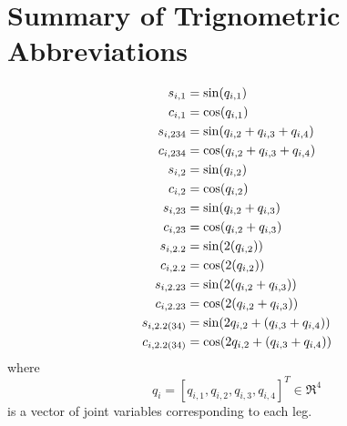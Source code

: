 \chapter{Summary of Trignometric Abbreviations}
	\label{appendix::e}

		\begin{equation*}
		\begin{split}\small
			s_{i,1} 	&= \sin(q_{i,1})					\\
			c_{i,1} 	&= \cos(q_{i,1})					\\
			s_{i,234} 	&= \sin(q_{i,2}+q_{i,3}+q_{i,4})	\\
			c_{i,234} 	&= \cos(q_{i,2}+q_{i,3}+q_{i,4})	\\
			s_{i,2} 	&= \sin(q_{i,2})					\\
			c_{i,2} 	&= \cos(q_{i,2})					\\
			s_{i,23} 	&= \sin(q_{i,2}+q_{i,3})			\\
			c_{i,23} 	&= \cos(q_{i,2}+q_{i,3})			\\
			s_{i,2.2} 	&= \sin(2(q_{i,2}))					\\
			c_{i,2.2} 	&= \cos(2(q_{i,2}))					\\
			s_{i,2.23} 	&= \sin(2(q_{i,2}+q_{i,3}))			\\
			c_{i,2.23} 	&= \cos(2(q_{i,2}+q_{i,3}))			\\
			s_{i,2.2(34)}&= \sin(2q_{i,2}+(q_{i,3}+q_{i,4}))	\\
			c_{i,2.2(34)}&= \cos(2q_{i,2}+(q_{i,3}+q_{i,4}))	\\
		\end{split}
	\end{equation*}
	where 
	\begin{equation*}
		q_{i} = [q_{i,1},q_{i,2},q_{i,3},q_{i,4}]^{T} \in \Re^{4} 
	\end{equation*}
	is a vector of joint variables corresponding to each \Ith leg.